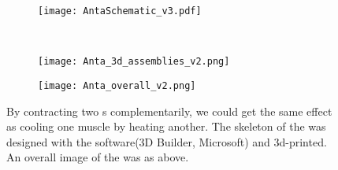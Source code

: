 \begin{figure}[t]
	\centering
	\begin{subfigure}[t]{0.5\textwidth}
		\centering\texttt{[image: AntaSchematic\_v3.pdf]}
		\caption{\label{anta_sch}}
	\end{subfigure}
	~			
	\begin{subfigure}[t]{0.3\textwidth}
		\centering\texttt{[image: Anta\_3d\_assemblies\_v2.png]}
		\caption{\label{3d_assemblies}}
	\end{subfigure}
	
	\begin{subfigure}[t]{0.81\textwidth}
		\centering\texttt{[image: Anta\_overall\_v2.png]}
		\caption{\label{anta_overall}}
	\end{subfigure}
	
	\caption[\Anta]{ By contracting two \scpnospace s complementarily, we could get the same effect as cooling one muscle by heating another.  The skeleton of the \anta was designed with the software(3D Builder, Microsoft) and 3d-printed.  An overall image of the \anta was as above.}
	\label{anta_design}
\end{figure}
